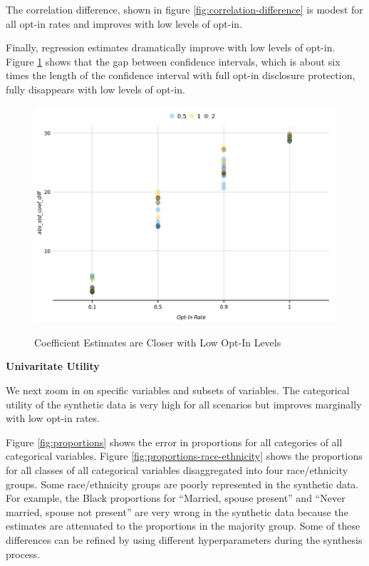 \documentclass[
]{urban-formatting}
\begin{document}
The correlation difference, shown in figure
\ref{fig:correlation-difference} is modest for all opt-in rates and
improves with low levels of opt-in.

Finally, regression estimates dramatically improve with low levels of
opt-in. Figure \ref{fig:regression} shows that the gap between
confidence intervals, which is about six times the length of the
confidence interval with full opt-in disclosure protection, fully
disappears with low levels of opt-in.

\begin{figure}[!htb]
    \caption{Coefficient Estimates are Closer with Low Opt-In Levels}
    \centering
    \includegraphics[width=6.5in]{../analysis/figures/regression-overlap-1.png}
    \label{fig:regression}
\end{figure}

\textbf{Univaritate Utility}

We next zoom in on specific variables and subsets of variables. The
categorical utility of the synthetic data is very high for all scenarios
but improves marginally with low opt-in rates.

Figure \ref{fig:proportions} shows the error in proportions for all
categories of all categorical variables. Figure
\ref{fig:proportions-race-ethnicity} shows the proportions for all
classes of all categorical variables disaggregated into four
race/ethnicity groups. Some race/ethnicity groups are poorly represented
in the synthetic data. For example, the Black proportions for ``Married,
spouse present'' and ``Never married, spouse not present'' are very
wrong in the synthetic data because the estimates are attenuated to the
proportions in the majority group. Some of these differences can be
refined by using different hyperparameters during the synthesis process.
\end{document}
